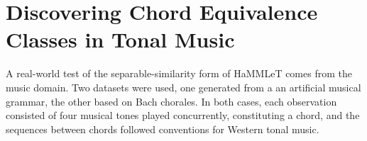 

\section{Discovering Chord Equivalence Classes in Tonal Music}
\label{sec:disc-chord-equiv}

A real-world test of the separable-similarity form of HaMMLeT comes
from the music domain.  Two datasets were used, one generated from a
an artificial musical grammar, the other based on Bach chorales. 
In both cases, each observation consisted of four musical tones played concurrently, 
constituting a chord, and the sequences between chords followed 
conventions for Western tonal music.  

